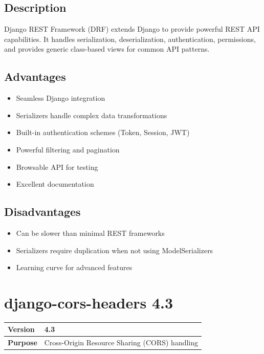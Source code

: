 \documentclass[12pt,a4paper]{report}
\begin{document}
\subsection{Description}

Django REST Framework (DRF) extends Django to provide powerful REST API capabilities. It handles serialization, deserialization, authentication, permissions, and provides generic class-based views for common API patterns.

\subsection{Advantages}

\begin{itemize}
    \item Seamless Django integration
    \item Serializers handle complex data transformations
    \item Built-in authentication schemes (Token, Session, JWT)
    \item Powerful filtering and pagination
    \item Browsable API for testing
    \item Excellent documentation
\end{itemize}

\subsection{Disadvantages}

\begin{itemize}
    \item Can be slower than minimal REST frameworks
    \item Serializers require duplication when not using ModelSerializers
    \item Learning curve for advanced features
\end{itemize}

\section{django-cors-headers 4.3}

\begin{tabular}{|p{4cm}|p{10cm}|}
\hline
\textbf{Version} & 4.3 \\
\hline
\textbf{Purpose} & Cross-Origin Resource Sharing (CORS) handling \\
\hline
\end{tabular}
\end{document}
